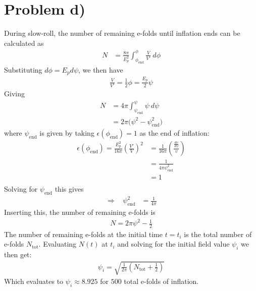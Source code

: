 \documentclass[reprint,english,notitlepage]{revtex4-1}  %
\numberwithin{equation}{section}
\begin{document}
\section{Problem d)}
During slow-roll, the number of remaining e-folds until inflation ends can be
calculated as
\begin{align}
	N &= \frac{8\pi}{E_p^2} \int_{\phi_{\mathrm{end}}}^\phi \frac{V}{V'}\ d\phi
\end{align}
Substituting $d\phi = E_p d\psi$, we then have
\begin{align}
	\frac{V}{V'} = \frac{1}{2}\phi = \frac{E_p}{2}\psi
\end{align}
Giving
\begin{align}
	N &= 4\pi \int_{\psi_{\mathrm{end}}}^\psi \psi\ d\psi \\
	  &= 2\pi \bigg( \psi^2 - \psi_{\mathrm{end}}^2 \bigg)	\label{eq:N-psi_i}
\end{align}
where $\psi_{\mathrm{end}}$ is given by taking $\epsilon(\phi_{\mathrm{end}})=1$
as the end of inflation:
\begin{align}
	\epsilon(\phi_{\mathrm{end}}) = \frac{E_p^2}{16\pi} \left(\frac{V'}{V}\right)^2
	 	&= \frac{1}{16\pi}\left(\frac{\frac{dv}{d\psi}}{v}\right) \\
											 &= \frac{1}{4\pi \psi_{\mathrm{end}}^2} \\
											 &= 1 \\
\end{align}
Solving for $\psi_{\mathrm{end}}$ this gives
\begin{align}
	\Rightarrow \ \ \ \ \psi_{\mathrm{end}}^2 &= \frac{1}{4\pi}
\end{align}
Inserting this, the number of remaining e-folds is
\begin{align}
	N = 2\pi \psi^2 - \frac{1}{2}
\end{align}
The number of remaining e-folds at the initial time $t=t_i$ is
the total number of e-folds $N_{\mathrm{tot}}$. Evaluating $N(t)$ at $t_i$ and solving for
the initial field value $\psi_i$ we then get:
\begin{align}
	\psi_i = \sqrt{ \frac{1}{2\pi} \left(N_{\mathrm{tot}} + \frac{1}{2} \right) }
\end{align}
Which evaluates to $\psi_i \approx 8.925$ for $500$ total e-folds of inflation.
\end{document}
